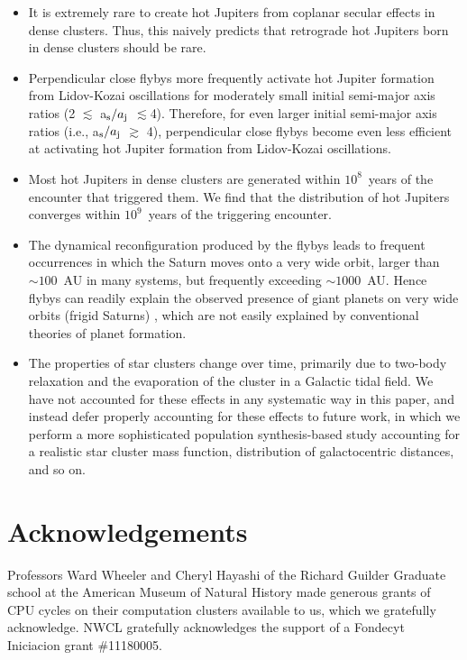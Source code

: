 \documentclass[twocolumn]{aastex63}
\begin{document}
\begin{itemize}
    \item It is extremely rare to create hot Jupiters from coplanar secular effects in dense clusters. Thus, this naively predicts that retrograde hot Jupiters born in dense clusters should be rare.
    
    \item Perpendicular close flybys more frequently activate hot Jupiter formation from Lidov-Kozai oscillations for moderately small initial semi-major axis ratios (2 $\lesssim$ a$_{\rm s}/a_{\rm j}$ $\lesssim$4). Therefore, for even larger initial semi-major axis ratios (i.e., a$_{\rm s}/a_{\rm j}$ $\gtrsim$ 4), perpendicular close flybys become even less efficient at activating hot Jupiter formation from Lidov-Kozai oscillations.
    
    \item Most hot Jupiters in dense clusters are generated within $10^8$~years of the encounter that triggered them. We find that the distribution of hot Jupiters converges within $10^9$~years of the triggering encounter.
    
    \item 
     The dynamical reconfiguration produced by the flybys leads to frequent occurrences in which the Saturn moves onto a very wide orbit, larger than $\sim 100$~AU in many systems, but frequently exceeding $\sim 1000$~AU. Hence 
    flybys can readily explain the observed presence of giant planets on very wide orbits (frigid Saturns) \citep{Lafreniere2011}, which are not easily explained by conventional theories of planet formation.
    
    \item The properties of star clusters change over time, primarily due to two-body relaxation and the evaporation of the cluster in a Galactic tidal field.  We have not accounted for these effects in any systematic way in this paper, and instead defer properly accounting for these effects to future work, in which we perform a more sophisticated population synthesis-based study accounting for a realistic star cluster mass function, distribution of galactocentric distances, and so on.
\end{itemize}






\section*{Acknowledgements}
Professors Ward Wheeler and Cheryl Hayashi of the Richard Guilder Graduate school at the American Museum of Natural History made generous grants of CPU cycles on their computation clusters available to us, which we gratefully acknowledge.  NWCL gratefully acknowledges the support of a Fondecyt Iniciacion grant \#11180005.




{}

\end{document}
